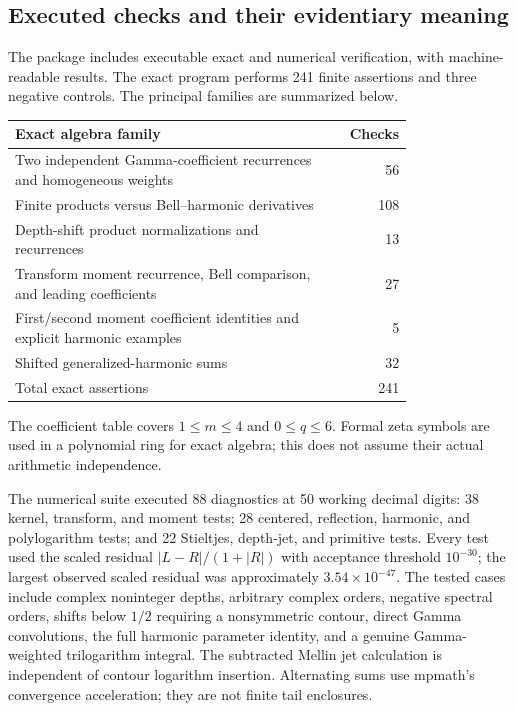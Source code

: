 \documentclass[11pt,letterpaper]{article}
\numberwithin{equation}{section}
\theoremstyle{definition}\newtheorem{definition}[theorem]{Definition}
\theoremstyle{remark}\newtheorem{remark}[theorem]{Remark}
\begin{document}
\subsection{Executed checks and their evidentiary meaning}
The package includes executable exact and numerical verification, with
machine-readable results. The exact program performs 241 finite
assertions and three negative controls. The principal families are
summarized below.
\begin{center}
\begin{tabular}{@{}p{0.79\linewidth}r@{}}
\toprule
Exact algebra family & Checks\\\midrule
Two independent Gamma-coefficient recurrences and homogeneous weights &56\\
Finite products versus Bell--harmonic derivatives &108\\
Depth-shift product normalizations and recurrences &13\\
Transform moment recurrence, Bell comparison, and leading coefficients &27\\
First/second moment coefficient identities and explicit harmonic examples &5\\
Shifted generalized-harmonic sums &32\\\midrule
Total exact assertions &241\\\bottomrule
\end{tabular}
\end{center}
The coefficient table covers $1\le m\le4$ and $0\le q\le6$.
Formal zeta symbols are used in a polynomial ring for exact algebra;
this does not assume their actual arithmetic independence.

The numerical suite executed 88 diagnostics at 50 working decimal digits:
38 kernel, transform, and moment tests; 28 centered, reflection, harmonic,
and polylogarithm tests; and 22 Stieltjes, depth-jet, and primitive tests. Every test used the
scaled residual $|L-R|/(1+|R|)$ with acceptance threshold $10^{-30}$;
the largest observed scaled residual was approximately $3.54\times10^{-47}$.
The tested cases include complex noninteger depths, arbitrary complex
orders, negative spectral orders, shifts below $1/2$ requiring a
nonsymmetric contour, direct Gamma convolutions, the full harmonic
parameter identity, and a genuine Gamma-weighted trilogarithm integral.
The subtracted Mellin jet calculation is independent of contour logarithm
insertion. Alternating sums use mpmath's convergence acceleration;
they are not finite tail enclosures.
\end{document}
